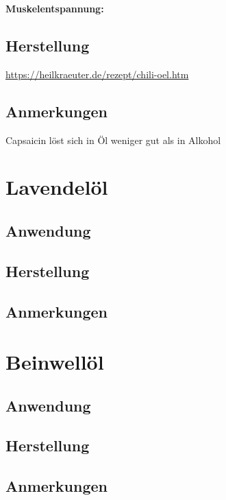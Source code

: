 \textbf{Muskelentspannung:}

\subsection{Herstellung}

\url{https://heilkraeuter.de/rezept/chili-oel.htm}

\subsection{Anmerkungen}

Capsaicin löst sich in Öl weniger gut als in Alkohol




\section{Lavendelöl}

\subsection{Anwendung}

\subsection{Herstellung}

\subsection{Anmerkungen}





\section{Beinwellöl}

\subsection{Anwendung}

\subsection{Herstellung}

\subsection{Anmerkungen}
